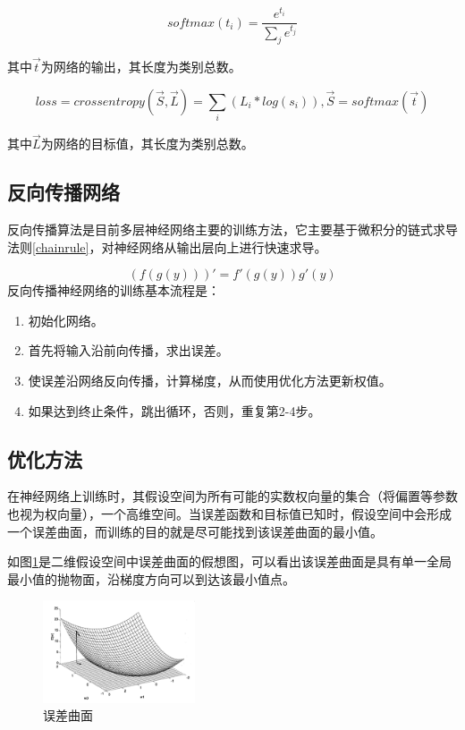 \begin{equation}
softmax(t_i) = \frac{e^{t_i}}{\sum_j{e^{t_j}}}
\end{equation}


其中$\vec{t}$为网络的输出，其长度为类别总数。


\begin{equation}
loss = crossentropy(\vec{S}, \vec{L}) 
= \sum_i {(L_i * log(s_i))}, \vec{S} = softmax{(\vec{t})}
\end{equation}


其中$\vec{L}$为网络的目标值，其长度为类别总数。

\subsection{反向传播网络}
反向传播算法是目前多层神经网络主要的训练方法，它主要基于微积分的链式求导法则\ref{chainrule}，对神经网络从输出层向上进行快速求导。

\begin{equation} \label{chainrule}
(f(g(y)))' = f'(g(y))g'(y)
\end{equation}
反向传播神经网络的训练基本流程是：\par
\begin{enumerate}
\item 初始化网络。
\item 首先将输入沿前向传播，求出误差。
\item 使误差沿网络反向传播，计算梯度，从而使用优化方法更新权值。
\item 如果达到终止条件，跳出循环，否则，重复第2-4步。
\end{enumerate}

\subsection{优化方法}
在神经网络上训练时，其假设空间为所有可能的实数权向量的集合（将偏置等参数也视为权向量），一个高维空间。当误差函数和目标值已知时，假设空间中会形成一个误差曲面，而训练的目的就是尽可能找到该误差曲面的最小值。\par
如图\ref{ann3}是二维假设空间中误差曲面的假想图，可以看出该误差曲面是具有单一全局最小值的抛物面，沿梯度方向可以到达该最小值点。\par
\begin{figure}[!hbp]
\begin{center}
\includegraphics[width=0.4\textwidth]{graphic/ann3.png}
\caption{误差曲面\cite{ml2006} \label{ann3}}
\end{center}
\end{figure}
